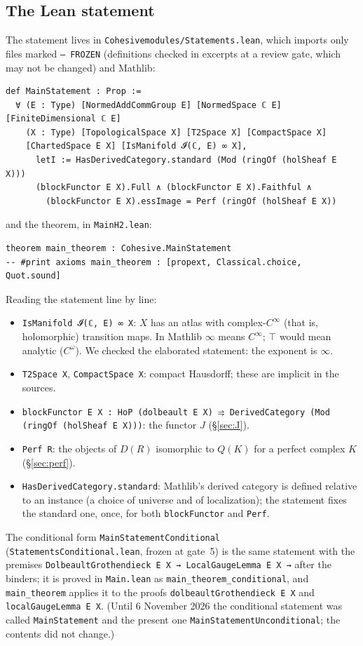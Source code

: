 \subsection{The Lean statement}
The statement lives in \texttt{Cohesivemodules/Statements.lean}, which imports only files marked
\texttt{-- FROZEN} (definitions checked in excerpts at a review gate, which may not be changed)
and Mathlib:
\begin{verbatim}
def MainStatement : Prop :=
  ∀ (E : Type) [NormedAddCommGroup E] [NormedSpace ℂ E] [FiniteDimensional ℂ E]
    (X : Type) [TopologicalSpace X] [T2Space X] [CompactSpace X]
    [ChartedSpace E X] [IsManifold 𝓘(ℂ, E) ∞ X],
      letI := HasDerivedCategory.standard (Mod (ringOf (holSheaf E X)))
      (blockFunctor E X).Full ∧ (blockFunctor E X).Faithful ∧
        (blockFunctor E X).essImage = Perf (ringOf (holSheaf E X))
\end{verbatim}
and the theorem, in \texttt{MainH2.lean}:
\begin{verbatim}
theorem main_theorem : Cohesive.MainStatement
-- #print axioms main_theorem : [propext, Classical.choice, Quot.sound]
\end{verbatim}
Reading the statement line by line:
\begin{itemize}
\item \texttt{IsManifold 𝓘(ℂ, E) ∞ X}: $X$ has an atlas with complex-$C^\infty$ (that is,
holomorphic) transition maps. In Mathlib $\infty$ means $C^\infty$; $\top$ would mean
analytic ($C^\omega$). We checked the elaborated statement: the exponent is $\infty$.
\item \texttt{T2Space X}, \texttt{CompactSpace X}: compact Hausdorff; these are implicit in the
sources.
\item \texttt{blockFunctor E X : HoP (dolbeault E X) ⥤ DerivedCategory (Mod (ringOf (holSheaf E X)))}:
the functor $J$ (\S\ref{sec:J}).
\item \texttt{Perf R}: the objects of $D(R)$ isomorphic to $Q(K)$ for a perfect complex $K$
(\S\ref{sec:perf}).
\item \texttt{HasDerivedCategory.standard}: Mathlib's derived category is defined relative to an
instance (a choice of universe and of localization); the statement fixes the standard one,
once, for both \texttt{blockFunctor} and \texttt{Perf}.
\end{itemize}
The conditional form \texttt{MainStatementConditional} (\texttt{StatementsConditional.lean}, frozen
at gate~5) is the same statement with the premises
\texttt{DolbeaultGrothendieck E X → LocalGaugeLemma E X →} after the binders; it is proved in
\texttt{Main.lean} as \texttt{main\_theorem\_conditional}, and \texttt{main\_theorem} applies it to the
proofs \texttt{dolbeaultGrothendieck E X} and \texttt{localGaugeLemma E X}. (Until 6 November 2026
the conditional statement was called \texttt{MainStatement} and the present one
\texttt{MainStatementUnconditional}; the contents did not change.)

